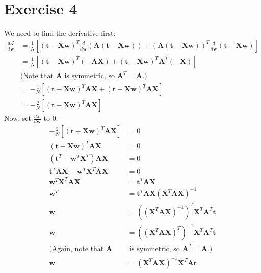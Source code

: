 \documentclass[12pt]{amsart}
\newcommand{\vect}[1]{\mathbf{#1}}
\begin{document}
\section*{Exercise 4}
We need to find the derivative first:
\begin{align*}
   \frac{d\mathcal{L}}{d\vect{w}}&=\frac{1}{N}[
   (\vect{t}-\vect{Xw})^T \frac{d}{d\vect{w}}(\vect{A(t-Xw)}) +
   (\vect{A(t-Xw)})^T \frac{d}{d\vect{w}}(\vect{t}-\vect{Xw})
   ]\\
   &= \frac{1}{N}[(\vect{t}-\vect{Xw})^T(-\vect{AX})+ \vect{(t-Xw)}^T\vect{A}^T(-\vect{X})]\\
   &\mbox{(Note that $\vect{A}$ is symmetric, so $\vect{A}^T = \vect{A}$.)}\\
   & = -\frac{1}{N}[\vect{(t-Xw)}^T\vect{AX}+\vect{(t-Xw)}^T\vect{AX}]\\
   & = -\frac{2}{N}[\vect{(t-Xw)}^T\vect{AX}]
\end{align*}
Now, set $ \frac{d\mathcal{L}}{d\vect{w}}$ to $0$:
\begin{align*}
    -\frac{2}{N}[\vect{(t-Xw)}^T\vect{AX}]&=0\\
    \vect{(t-Xw)}^T\vect{AX}&=0\\
    (\vect{t}^T-\vect{w}^T\vect{X}^T)\vect{AX}&=0\\
    \vect{t}^T\vect{AX}-\vect{w}^T\vect{X}^T\vect{AX}&=0\\
    \vect{w}^T\vect{X}^T\vect{AX} &=\vect{t}^T\vect{AX}\\
    \vect{w}^T&=\vect{t}^T\vect{AX}(\vect{X}^T\vect{AX})^{-1}\\
    \vect{w} &= ((\vect{X}^T\vect{AX})^{-1})^{T}\vect{X}^T\vect{A}^T\vect{t}\\
    \vect{w} &= ((\vect{X}^T\vect{AX})^{T})^{-1}\vect{X}^T\vect{A}^T\vect{t}\\
    \mbox{(Again, note that $\vect{A}$}&\mbox{  is symmetric, so $\vect{A}^T = \vect{A}$.)}\\
    \vect{w} &=(\vect{X}^T\vect{AX})^{-1}\vect{X}^T\vect{A}\vect{t}
\end{align*}
\end{document}
